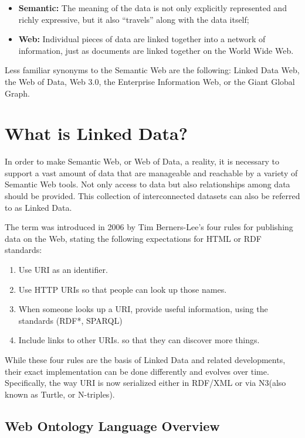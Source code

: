 \documentclass[thesis=M,english,hidelinks]{FITthesis}[2019/12/23]
\begin{document}
\begin{itemize}
	\item  \textbf{Semantic:} The meaning of the data is not only explicitly represented and richly expressive, but it also “travels” along with the data itself;
	\item \textbf{Web:} Individual pieces of data are linked together into a network of information, just as documents are linked together on the World Wide Web.
\end{itemize}

Less familiar synonyms to the Semantic Web are the following: Linked Data Web, the Web of Data, Web 3.0, the Enterprise Information Web, or the Giant Global Graph.

\section{What is Linked Data?}

In order to make Semantic Web, or Web of Data, a reality, it is necessary to support a vast amount of data that are manageable and reachable by a variety of Semantic Web tools. Not only access to data but also relationships among data should be provided. This collection of interconnected datasets can also be referred to as Linked Data.

The term was introduced in 2006 by Tim Berners-Lee's four rules for publishing data on the Web\cite{Berners_LinkedData}, stating the following expectations for \gls{HTML} or \gls{RDF} standards:
\begin{enumerate}
	\item Use \gls{URI} as an identifier.
	\item Use \gls{HTTP} \gls{URI}s so that people can look up those names.
	\item When someone looks up a \gls{URI}, provide useful information, using the standards (\gls{RDF}*, \gls{SPARQL})
	\item Include links to other \gls{URI}s. so that they can discover more things.
\end{enumerate}

While these four rules are the basis of Linked Data and related developments, their exact implementation can be done differently and evolves over time. Specifically, the way \gls{URI} is now serialized either in \gls{RDF}/\gls{XML} or via N3(also known as Turtle, or N-triples).

\subsection{Web Ontology Language Overview}
\end{document}
